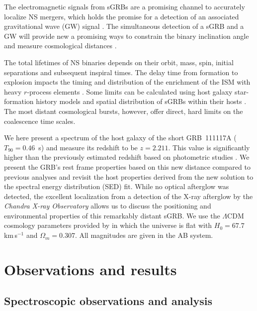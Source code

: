 \documentclass{aa}    %
\begin{document}
The electromagnetic signals from sGRBs are a promising channel to accurately
localize NS mergers, which holds the promise for a detection of an associated
gravitational wave (GW) signal \citep{Ghirlanda2016}. The simultaneous detection
of a sGRB and a GW will provide new a promising ways to constrain the binary
inclination angle \citep{Arun2014} and measure cosmological distances
\citep{Nissanke2010}.

The total lifetimes of NS binaries depends on their orbit, mass, spin, initial
separations and subsequent inspiral times. The delay time from formation to
explosion impacts the timing and distribution of the enrichment of the ISM with
heavy $r$-process elements \citep{VandeVoort2015, Wallner2015,  Ji2016}. Some
limits can be calculated using host galaxy star-formation history models and
spatial distribution of sGRBs within their hosts \citep[][]{Berger2014}. The
most distant cosmological bursts, however, offer direct, hard limits on the
coalescence time scales.


We here present a spectrum of the host galaxy of the short
GRB~111117A ($T_{90}=0.46$~s) and measure its redshift to be $z=2.211$. This
value is significantly higher than the previously estimated redshift based on
photometric studies \citep{Margutti2012,Sakamoto2013}. We present the GRB's rest
frame properties based on this new distance compared to previous analyses and
revisit the host properties derived from the new solution to the spectral energy distribution (SED) fit.
While no optical afterglow was detected, the excellent localization from a
detection of the X-ray afterglow by the \emph{Chandra X-ray Observatory}
allows us to discuss the positioning and environmental properties of this
remarkably distant sGRB.
We use the $\Lambda$CDM cosmology parameters provided by
\citet{Planck2015} in which the universe is flat with $H_0 = 67.7$\,km\,s$^{-1}$
and $\Omega_m = 0.307$. All magnitudes are given in the AB system.


\section{Observations and results}

\subsection{Spectroscopic observations and analysis}
\end{document}
